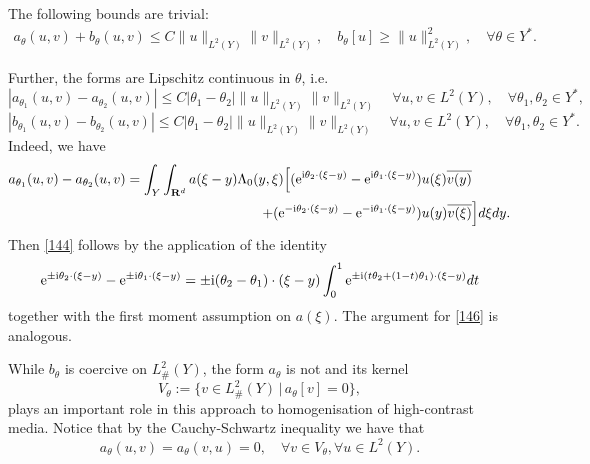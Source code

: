 \documentclass[11pt]{article}
\def\rme{{\rm e}}
\def\rmi{{\rm i}}
\newcommand{\R}{\mathbf{R}}
\theoremstyle{remark}
\begin{document}
The following  bounds are trivial:
\begin{equation}\label{143}
	\begin{gathered}
		a_\theta(u,v) +	b_\theta(u,v)\leq C\|u \|_{L^2(Y)} \|v \|_{L^2(Y)},\quad
		b_\theta[u] \geq \|u \|_{L^2(Y)}^2, \quad \forall \theta  \in  Y^*.
	\end{gathered}
\end{equation}

Further, the forms are Lipschitz continuous in $\theta$, i.e.
\begin{equation}\label{144}
	|a_{\theta_1}(u,v) -  a_{\theta_2}(u,v)| \leq C |\theta_1 - \theta_2| \|u\|_{L^2(Y)} \|v\|_{L^2(Y)}\quad \forall u,v\in {L^2(Y)}, \quad \forall \theta_1, \theta_2 \in  Y^*,
\end{equation}
\begin{equation}\label{146}
	|b_{\theta_1}(u,v) -  b_{\theta_2}(u,v)| \leq C|\theta_1 - \theta_2| \|u\|_{L^2(Y)} \|v\|_{L^2(Y)}\quad \forall u,v\in {L^2(Y)}, \quad \forall \theta_1, \theta_2 \in  Y^*.
\end{equation}
Indeed, we have
\begin{equation*}%
	\begin{aligned}
		a_{\theta_1}(u,v) -  a_{\theta_2}(u,v)= \int_{Y}\int_{\R^d} a(\xi - y) \Lambda_0(y,\xi) \Big[(\rme^{\rmi \theta_2\cdot(\xi - y)}  - \rme^{\rmi \theta_1\cdot(\xi - y)}) &u(\xi)\overline{v(y)}
		\\  +
		(\rme^{-\rmi \theta_2\cdot(\xi - y)}  - \rme^{-\rmi \theta_1\cdot(\xi - y)})& u(y)\overline{v(\xi)}\Big]  d\xi dy.
	\end{aligned}
\end{equation*}
Then \eqref{144} follows by the application of the identity
\[
\rme^{\pm\rmi \theta_2\cdot(\xi - y)}  - \rme^{\pm\rmi \theta_1\cdot(\xi - y)} = \pm \rmi (\theta_2 - \theta_1)\cdot(\xi - y) \int_0^1 \rme^{\pm\rmi (t\theta_2 + (1-t) \theta_1)\cdot(\xi - y)}dt
\]
  together with the first moment assumption on $a(\xi)$.  The argument for \eqref{146} is analogous.



\medskip

While $b_\theta$ is coercive on $L^2_\#(Y)$, the form $a_\theta$ is not and its kernel
\begin{equation*}
	V_\theta :=\{v\in {L^2_\#(Y)} \, \vert \, a_\theta[v] = 0 \},
\end{equation*}
plays an important role in  this approach to homogenisation  of high-contrast media. Notice that by the Cauchy-Schwartz inequality we have that
\begin{equation}\label{148}
    a_\theta(u,v) = a_\theta(v,u) = 0, \quad \forall v\in V_\theta, \forall u \in L^2(Y).
\end{equation}
\end{document}

